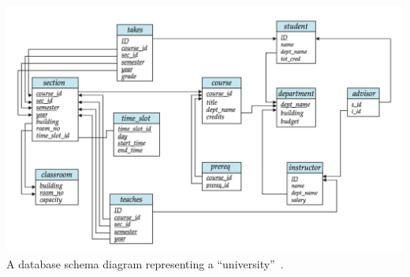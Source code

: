 \begin{center}
	\includegraphics[width=\textwidth]{images/schemadiagram.png}\\
	A database schema diagram representing a ``university''~\cite{dsc}.
\end{center}




